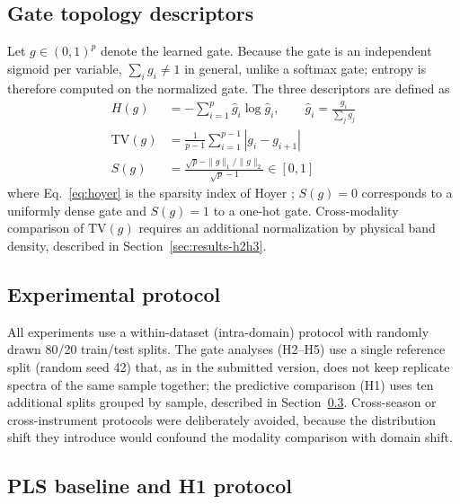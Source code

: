 \documentclass[preprint,12pt]{elsarticle}
\begin{document}
\subsection{Gate topology descriptors}
\label{sec:topology}

Let $g\in(0,1)^{p}$ denote the learned gate. Because the gate is an independent sigmoid per variable, $\sum_i g_i \neq 1$ in general, unlike a softmax gate; entropy is therefore computed on the normalized gate. The three descriptors are defined as
\begin{align}
H(g) &= -\sum_{i=1}^{p} \hat g_i \log \hat g_i, \qquad \hat g_i = \frac{g_i}{\sum_j g_j} \label{eq:entropy}\\
\mathrm{TV}(g) &= \frac{1}{p-1}\sum_{i=1}^{p-1} |g_i - g_{i+1}| \label{eq:tv}\\
S(g) &= \frac{\sqrt{p}-\|g\|_1/\|g\|_2}{\sqrt{p}-1} \in [0,1] \label{eq:hoyer}
\end{align}
where Eq.~\eqref{eq:hoyer} is the sparsity index of Hoyer \cite{hoyer2004}; $S(g)=0$ corresponds to a uniformly dense gate and $S(g)=1$ to a one-hot gate. Cross-modality comparison of $\mathrm{TV}(g)$ requires an additional normalization by physical band density, described in Section~\ref{sec:results-h2h3}.

\subsection{Experimental protocol}

All experiments use a within-dataset (intra-domain) protocol with randomly drawn 80/20 train/test splits. The gate analyses (H2--H5) use a single reference split (random seed 42) that, as in the submitted version, does not keep replicate spectra of the same sample together; the predictive comparison (H1) uses ten additional splits grouped by sample, described in Section~\ref{sec:pls}. Cross-season or cross-instrument protocols were deliberately avoided, because the distribution shift they introduce would confound the modality comparison with domain shift.


\subsection{PLS baseline and H1 protocol}
\label{sec:pls}
\end{document}
